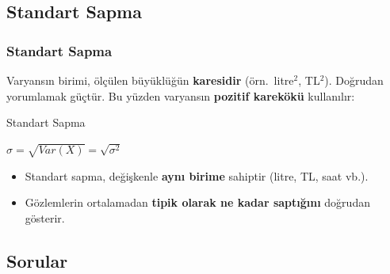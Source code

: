 ﻿\documentclass[light]{lutbeamer}
\begin{document}
\subsection{Standart Sapma}

\begin{frame}[fragile]
  \frametitle{Standart Sapma}
  Varyansın birimi, ölçülen büyüklüğün \textbf{karesidir} (örn.\ litre$^2$, TL$^2$). Doğrudan yorumlamak güçtür. Bu yüzden varyansın \textbf{pozitif karekökü} kullanılır:

  \begin{center}
    \begin{minipage}{0.8\textwidth}
      \begin{block}{Standart Sapma}
        \begin{center}
          $\sigma = \sqrt{Var(X)} = \sqrt{\sigma^2}$
        \end{center}
      \end{block}
    \end{minipage}
  \end{center}

  \begin{itemize}
    \item Standart sapma, değişkenle \textbf{aynı birime} sahiptir (litre, TL, saat vb.).
    \item Gözlemlerin ortalamadan \textbf{tipik olarak ne kadar saptığını} doğrudan gösterir.
  \end{itemize}
\end{frame}

\subsection{Sorular}
\end{document}
